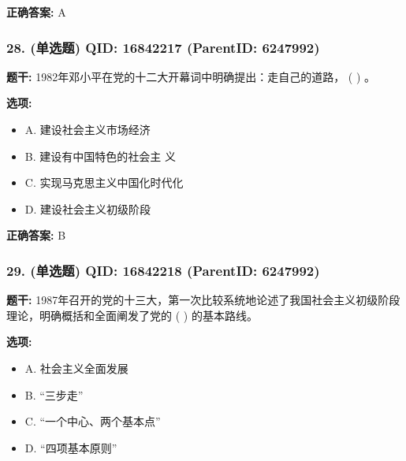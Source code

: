\documentclass[12pt,UTF8]{ctexart}
\begin{document}
\textbf{正确答案:}
A

\vspace{0.3em}\hrulefill\vspace{0.7em}

\subsubsection*{28. (单选题) \small QID: 16842217 (ParentID: 6247992)}

\textbf{题干:}
1982年邓小平在党的十二大开幕词中明确提出：走自己的道路， ( ) 。



\textbf{选项:}
\begin{itemize}[leftmargin=*]

  \item A. 建设社会主义市场经济

  \item B. 建设有中国特色的社会主 义

  \item C. 实现马克思主义中国化时代化

  \item D. 建设社会主义初级阶段

\end{itemize}

\textbf{正确答案:}
B

\vspace{0.3em}\hrulefill\vspace{0.7em}

\subsubsection*{29. (单选题) \small QID: 16842218 (ParentID: 6247992)}

\textbf{题干:}
1987年召开的党的十三大，第一次比较系统地论述了我国社会主义初级阶段理论，明确概括和全面阐发了党的 ( ) 的基本路线。



\textbf{选项:}
\begin{itemize}[leftmargin=*]

  \item A. 社会主义全面发展

  \item B. “三步走”

  \item C. “一个中心、两个基本点”

  \item D. “四项基本原则”

\end{itemize}
\end{document}
